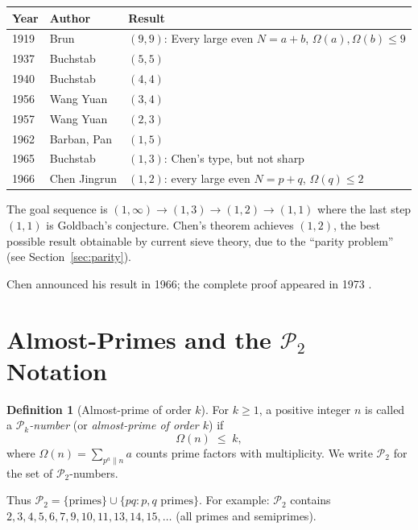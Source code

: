 \documentclass[12pt,a4paper]{amsart}
\theoremstyle{definition}
\newtheorem{definition}[theorem]{Definition}
\newcommand{\Ptwo}{\mathcal{P}_2}
\newcommand{\OOmega}{\Omega}   %
\begin{document}
\begin{center}
\begin{tabular}{@{}lll@{}}
\toprule
Year & Author & Result \\ \midrule
1919 & Brun        & $(9,9)$: Every large even $N = a + b$, $\OOmega(a),\OOmega(b) \leq 9$ \\
1937 & Buchstab    & $(5,5)$ \\
1940 & Buchstab    & $(4,4)$ \\
1956 & Wang Yuan   & $(3,4)$ \\
1957 & Wang Yuan   & $(2,3)$ \\
1962 & Barban, Pan & $(1,5)$ \\
1965 & Buchstab    & $(1,3)$: Chen's type, but not sharp \\
1966 & Chen Jingrun & $(1,2)$: every large even $N = p + q$, $\OOmega(q) \leq 2$ \\
\bottomrule
\end{tabular}
\end{center}

The goal sequence is $(1,\infty) \to (1,3) \to (1,2) \to (1,1)$ where the
last step $(1,1)$ is Goldbach's conjecture.  Chen's theorem achieves
$(1,2)$, the best possible result obtainable by current sieve theory, due
to the ``parity problem'' (see Section~\ref{sec:parity}).

Chen announced his result in 1966; the complete proof appeared in 1973
\cite{Chen1973}.

\section{Almost-Primes and the $\Ptwo$ Notation}

\begin{definition}[Almost-prime of order $k$]
  For $k \geq 1$, a positive integer $n$ is called a
  \emph{$\mathcal{P}_k$-number} (or \emph{almost-prime of order $k$}) if
  \[
    \OOmega(n) \;\leq\; k,
  \]
  where $\OOmega(n) = \sum_{p^a \| n} a$ counts prime factors with
  multiplicity.  We write $\Ptwo$ for the set of $\mathcal{P}_2$-numbers.
\end{definition}

Thus $\Ptwo = \{\text{primes}\} \cup \{pq : p, q \text{ primes}\}$.  For
example: $\Ptwo$ contains $2, 3, 4, 5, 6, 7, 9, 10, 11, 13, 14, 15, \ldots$
(all primes and semiprimes).
\end{document}

